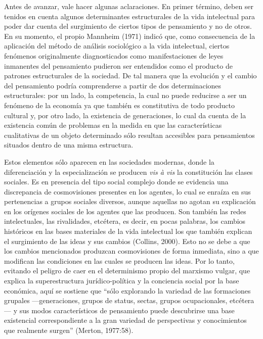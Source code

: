 Antes de avanzar, vale hacer algunas aclaraciones. En primer término, deben ser tenidos en cuenta algunos determinantes estructurales de la vida intelectual para poder dar cuenta del surgimiento de ciertos tipos de pensamiento y no de otros. En su momento, el propio Mannheim (1971) indicó que, como consecuencia de la aplicación del método de análisis sociológico a la vida intelectual, ciertos fenómenos originalmente diagnosticados como manifestaciones de leyes inmanentes del pensamiento pudieron ser entendidos como el producto de patrones estructurales de la sociedad. De tal manera que la evolución y el cambio del pensamiento podría comprenderse a partir de dos determinaciones estructurales: por un lado, la competencia, la cual no puede reducirse a ser un fenómeno de la economía ya que también es constitutiva de todo producto cultural y, por otro lado, la existencia de generaciones, lo cual da cuenta de la existencia común de problemas en la medida en que las características cualitativas de un objeto determinado sólo resultan accesibles para pensamientos situados dentro de una misma estructura.

Estos elementos sólo aparecen en las sociedades modernas, donde la diferenciación y la especialización se producen \emph{vis à vis} la constitución las clases sociales. Es en presencia del tipo social complejo donde se evidencia una discrepancia de cosmovisiones presentes en los agentes, lo cual se enraíza en sus pertenencias a grupos sociales diversos, aunque aquellas no agotan su explicación en los orígenes sociales de los agentes que las producen. Son también las redes intelectuales, las rivalidades, etcétera, es decir, en pocas palabras, los cambios históricos en las bases materiales de la vida intelectual los que también explican el surgimiento de las ideas y sus cambios (Collins, 2000). Esto no se debe a que los cambios mencionados produzcan cosmovisiones de forma inmediata, sino a que modifican las condiciones en las cuales se producen las ideas. Por lo tanto, evitando el peligro de caer en el determinismo propio del marxismo vulgar, que explica la superestructura jurídico-política y la conciencia social por la base económica, aquí se sostiene que ``sólo explorando la variedad de las formaciones grupales ---generaciones, grupos de status, sectas, grupos ocupacionales, etcétera--- y sus modos característicos de pensamiento puede descubrirse una base existencial correspondiente a la gran variedad de perspectivas y conocimientos que realmente surgen'' (Merton, 1977:58).

